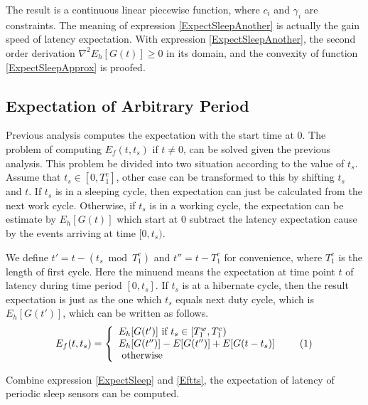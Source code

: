 \documentclass[conference]{IEEEtran}
\newcommand\numberthis{\addtocounter{equation}{1}\tag{\theequation}}
\begin{document}
The result is a continuous linear piecewise function, where $c_i$ and $\gamma_i$ are constraints. The meaning of expression \eqref{ExpectSleepAnother} is actually the gain speed of latency expectation. With expression \eqref{ExpectSleepAnother}, the second order derivation $\nabla^{2} E_h[G(t)]\geq0$ in its domain, and the convexity of function \eqref{ExpectSleepApprox} is proofed\cite{boyd2004convex}. 


\subsection{Expectation of Arbitrary Period}
Previous analysis computes the expectation with the start time at $0$. The problem of computing $E_f(t,t_s)$ if $t\ne0$, can be solved given the previous analysis. This problem be divided into two situation according to the value of $t_s$.
Assume that $t_s\in [0,T^{c}_{1}]$, other case can be transformed to this by shifting $t_s$ and $t$.
If $t_s$ is in a sleeping cycle, then expectation can just be calculated from the next work cycle.
Otherwise, if $t_s$ is in a working cycle, the expectation can be estimate by $E_h[G(t)]$ which start at $0$ subtract the latency expectation cause by the events arriving at time $[0, t_s)$.

We define $t'=t-(t_s\bmod T^{c}_{1})$ and $t''=t-T^{c}_{1}$ for convenience, where $T^{c}_{1}$ is the length of first cycle.
Here the minuend means the expectation at time point $t$ of latency during time period $[0, t_s]$.
If $t_s$ is at a hibernate cycle, then the result expectation is just as the one which $t_s$ equals next duty cycle, which is $E_h[G(t')]$, which can be written as follows.
\[E_f(t,t_s)=\left\{
    \begin{array}{lr}
    E_h[G(t')]\text{ if } t_s\in [T^{w}_{1}, T^{c}_{1})\\
    E_h[G(t'')]-E[G(t'')]+E[G(t-t_s)]\\
    \text{ otherwise }
    \end{array}\numberthis \label{Eftts}
    \right.
\]

Combine expression \eqref{ExpectSleep} and \eqref{Eftts}, the expectation of latency of periodic sleep sensors can be computed.
\end{document}
